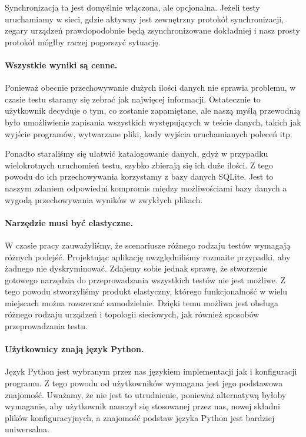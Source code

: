 \documentclass[00-praca-magisterska.tex]{subfiles}
\begin{document}

Synchronizacja ta jest domyślnie włączona, ale opcjonalna. Jeżeli testy
uruchamiamy w sieci, gdzie aktywny jest zewnętrzny protokół synchronizacji,
zegary urządzeń prawdopodobnie będą zsynchronizowane dokładniej i nasz prosty
protokół mógłby raczej pogorszyć sytuację.


\paragraph{Wszystkie wyniki są cenne.} Ponieważ obecnie przechowywanie dużych
ilości danych nie sprawia problemu, w czasie testu staramy się zebrać jak
najwięcej informacji. Ostatecznie to użytkownik decyduje o tym, co zostanie
zapamiętane, ale naszą myślą przewodnią było umożliwienie zapisania wszystkich
występujących w teście danych, takich jak wyjście programów, wytwarzane pliki,
kody wyjścia uruchamianych poleceń itp.

Ponadto staraliśmy się ułatwić katalogowanie danych, gdyż w przypadku
wielokrotnych uruchomień testu, szybko zbierają się ich duże ilości. Z tego
powodu do ich przechowywania korzystamy z bazy danych SQLite. Jest to naszym
zdaniem odpowiedni kompromis między możliwościami bazy danych a wygodą
przechowywania wyników w zwykłych plikach.

\paragraph{Narzędzie musi być elastyczne.} W czasie pracy zauważyliśmy, że
scenariusze różnego rodzaju testów wymagają różnych podejść. Projektując
aplikację uwzględniliśmy rozmaite przypadki, aby żadnego nie dyskryminować.
Zdajemy sobie jednak sprawę, że stworzenie gotowego narzędzia do przeprowadzania
wszystkich testów nie jest możliwe. Z tego powodu stworzyliśmy produkt
elastyczny, którego funkcjonalność w wielu miejscach można rozszerzać
samodzielnie. Dzięki temu możliwa jest obsługa różnego rodzaju urządzeń i
topologii sieciowych, jak również sposobów przeprowadzania testu.

\paragraph{Użytkownicy znają język Python.} Język Python jest wybranym przez nas
językiem implementacji jak i konfiguracji programu. Z tego powodu od
użytkowników wymagana jest jego podstawowa znajomość. Uważamy, że nie jest to
utrudnienie, ponieważ alternatywą byłoby wymaganie, aby użytkownik nauczył się
stosowanej przez nas, nowej składni plików konfiguracyjnych, a znajomość podstaw
języka Python jest bardziej uniwersalna.
\end{document}
